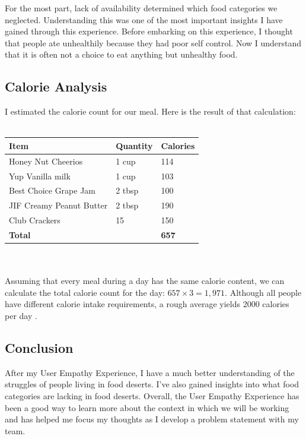 \documentclass[11pt]{article}
\begin{document}
For the most part, lack of availability determined which food categories we neglected. Understanding
this was one of the most important insights I have gained through this experience. Before embarking
on this experience, I thought that people ate unhealthily because they had poor self control. Now I
understand that it is often not a choice to eat anything but unhealthy food.

\pagebreak
\subsection{Calorie Analysis}
I estimated the calorie count for our meal. Here is the result of that calculation:\\\\
\begin{tabular}{ l l l }
    Item & Quantity & Calories \\
    \hline\hline
    Honey Nut Cheerios & 1 cup & 114 \\
    Yup Vanilla milk & 1 cup & 103 \\
    Best Choice Grape Jam & 2 tbsp & 100 \\
    JIF Creamy Peanut Butter & 2 tbsp & 190 \\
    Club Crackers & 15 & 150 \\
    \hline
    \textbf{Total} && \textbf{657}
\end{tabular}
\\\\
Assuming that every meal during a day has the same calorie content, we can calculate the total
calorie count for the day: $657 \times 3 = 1,971$. Although all people have different calorie intake
requirements, a rough average yields 2000 calories per day \cite{cal}.

\subsection{Conclusion}
After my User Empathy Experience, I have a much better understanding of the struggles of people
living in food deserts. I've also gained insights into what food categories are lacking in food
deserts. Overall, the User Empathy Experience has been a good way to learn more about the context in
which we will be working and has helped me focus my thoughts as I develop a problem statement with
my team.
\end{document}
